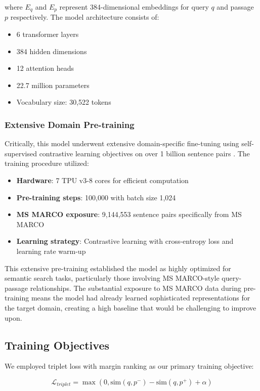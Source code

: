\documentclass[conference]{IEEEtran}
\begin{document}
where $E_q$ and $E_p$ represent 384-dimensional embeddings for query $q$ and passage $p$ respectively. The model architecture consists of:
\begin{itemize}
\item 6 transformer layers
\item 384 hidden dimensions
\item 12 attention heads
\item 22.7 million parameters
\item Vocabulary size: 30,522 tokens
\end{itemize}

\subsubsection{Extensive Domain Pre-training}
Critically, this model underwent extensive domain-specific fine-tuning using self-supervised contrastive learning objectives on over 1 billion sentence pairs \cite{huggingface_minilm}. The training procedure utilized:
\begin{itemize}
\item \textbf{Hardware}: 7 TPU v3-8 cores for efficient computation
\item \textbf{Pre-training steps}: 100,000 with batch size 1,024
\item \textbf{MS MARCO exposure}: 9,144,553 sentence pairs specifically from MS MARCO
\item \textbf{Learning strategy}: Contrastive learning with cross-entropy loss and learning rate warm-up
\end{itemize}

This extensive pre-training established the model as highly optimized for semantic search tasks, particularly those involving MS MARCO-style query-passage relationships. The substantial exposure to MS MARCO data during pre-training means the model had already learned sophisticated representations for the target domain, creating a high baseline that would be challenging to improve upon.

\subsection{Training Objectives}
We employed triplet loss \cite{schroff2015facenet} with margin ranking as our primary training objective:

\begin{equation}
\mathcal{L}_{triplet} = \max(0, \text{sim}(q,p^-) - \text{sim}(q,p^+) + \alpha)
\end{equation}
\end{document}
